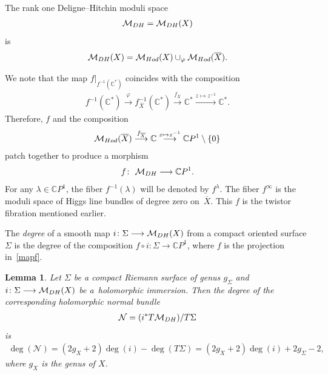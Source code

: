 \documentclass[11pt]{article}
\numberwithin{equation}{section}
\newtheorem{Lemma}[Theorem]{Lemma}
\begin{document}
\begin{Definition}\label{de1} The rank one Deligne--Hitchin moduli space \begin{gather*}{\mathcal M}_{\rm DH} = {\mathcal M}_{\rm DH}(X)\end{gather*} is
\begin{gather*}{\mathcal M}_{\rm DH}(X) = \mathcal M_{\rm Hod}(X)\cup_\varphi\mathcal M_{\rm Hod}(\overline{X}).\end{gather*}
\end{Definition}

We note that the map $f\vert_{f^{-1}({\mathbb C}^*)}$ coincides with the composition
\begin{gather*}
f^{-1}({\mathbb C}^*) \stackrel{\varphi}{\longrightarrow} f^{-1}_{\overline X}({\mathbb C}^*) \stackrel{f_{\overline X}}{\longrightarrow}
 {\mathbb C}^* \stackrel{z\mapsto z^{-1}}{\longrightarrow} {\mathbb C}^* .
\end{gather*}
Therefore, $f$ and the composition
\begin{gather*}
\mathcal M_{\rm Hod}(\overline{X}) \stackrel{f_{\overline X}}{\longrightarrow}  {\mathbb C} \stackrel{z\mapsto z^{-1}}{\longrightarrow}
{\mathbb C}P^1\setminus\{0\}
\end{gather*}
patch together to produce a morphism
\begin{gather}\label{mapf}
f \colon \ {\mathcal M}_{\rm DH} \longrightarrow \mathbb CP^1 .
\end{gather}
For any $\lambda \in \mathbb CP^1$, the f\/iber $f^{-1}(\lambda)$ will be denoted by $f^\lambda$. The f\/iber $f^{\infty}$ is the moduli space of Higgs line bundles of degree zero on~$\overline X$. This $f$ is the twistor f\/ibration mentioned earlier.

\begin{Definition} The {\it degree} of a smooth map $i \colon \Sigma \longrightarrow {\mathcal M}_{\rm DH}(X)$ from a compact oriented surface $\Sigma$ is the degree of the composition $f\circ i \colon \Sigma \longrightarrow {\mathbb C}P^1$, where $f$ is the projection in~\eqref{mapf}.
\end{Definition}

\begin{Lemma}\label{lemdeg} Let $\Sigma$ be a compact Riemann surface of genus $g_\Sigma$ and $i \colon \Sigma \longrightarrow {\mathcal M}_{\rm DH}(X)$ be a~holomorphic immersion. Then the degree of the corresponding holomorphic normal bundle \begin{gather*}{\mathcal N} = (i^*T{\mathcal
M}_{\rm DH})/T\Sigma\end{gather*} is
\begin{gather*}
\deg ({\mathcal N}) = (2 g_X +2)\deg (i)-\deg (T\Sigma) = (2 g_X +2)\deg (i) +2g_\Sigma-2 ,\end{gather*}
where $g_X$ is the genus of $X$.
\end{Lemma}
\end{document}

